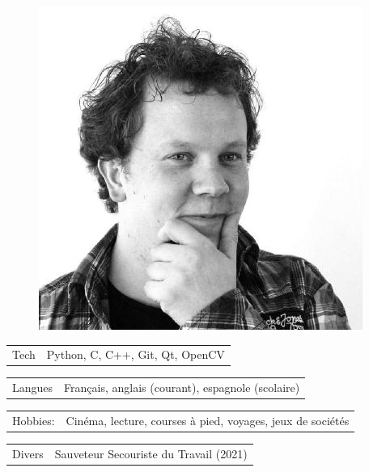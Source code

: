 \documentclass[10pt,A4]{article}
\newcommand{\tzlarrow}{(0,0) -- (0.2,0) -- (0.3,0.2) -- (0.2,0.4) -- (0,0.4) -- (0.1,0.2) -- cycle;}
\newcommand{\larrow}[1]
{\begin{tikzpicture}[scale=0.58]
	 \filldraw[fill=#1!100,draw=#1!100!black]  \tzlarrow
 \end{tikzpicture}
}
\newcommand{\metasection}[2]
{
\begin{tabular*}{1\textwidth}{p{2.4cm} p{11cm}}
\larrow{bgcol}	\normalsize{\textcolor{sectcol}{#1}}&#2\\[12pt]
\end{tabular*}
}
\begin{document}
\pagestyle{fancy}	


\vspace{-20.55pt}


\hspace{-0.25\linewidth}\colorbox{bgcol}{}



\begin{figure}[H]
\begin{flushright}
	\includegraphics[clip,width=0.2\linewidth]{profil_picture.jpg}	%
\end{flushright}
\end{figure}


\vspace{-114pt}

\metasection{Tech}{Python, C, C++, Git, Qt, OpenCV}
\metasection{Langues}{Français, anglais (courant), espagnole (scolaire)}
\metasection{Hobbies:}{Cinéma, lecture, courses à pied, voyages, jeux de sociétés}
\metasection{Divers}{Sauveteur Secouriste du Travail (2021)}
\end{document}
